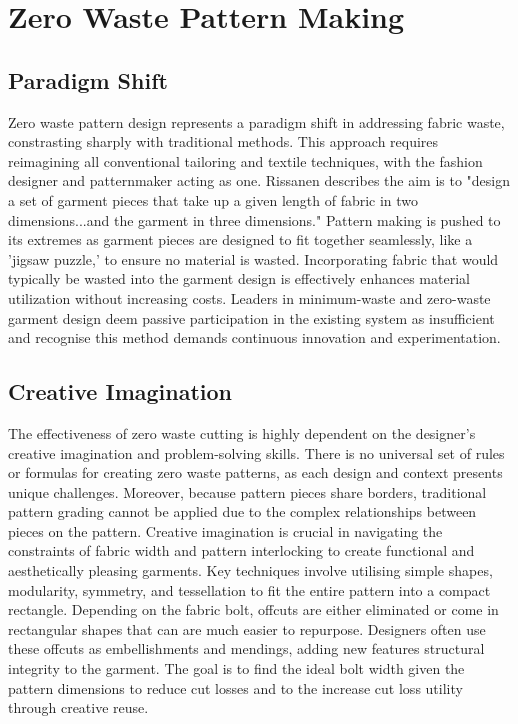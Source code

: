 \section{Zero Waste Pattern Making}
\subsection{Paradigm Shift}
Zero waste pattern design represents a paradigm shift in addressing fabric waste, constrasting sharply with traditional methods. This approach requires reimagining all conventional tailoring and textile techniques, with the fashion designer and patternmaker acting as one. Rissanen describes the aim is to "design a set of garment pieces that take up a given length of fabric in two dimensions...and the garment in three dimensions." Pattern making is pushed to its extremes as garment pieces are designed to fit together seamlessly, like a 'jigsaw puzzle,' to ensure no material is wasted. Incorporating fabric that would typically be wasted into the garment design is effectively enhances material utilization without increasing costs. Leaders in minimum-waste and zero-waste garment design deem passive participation in the existing system as insufficient and recognise this method demands continuous innovation and experimentation.

\subsection{Creative Imagination}
The effectiveness of zero waste cutting is highly dependent on the designer's creative imagination and problem-solving skills. There is no universal set of rules or formulas for creating zero waste patterns, as each design and context presents unique challenges. Moreover, because pattern pieces share borders, traditional pattern grading cannot be applied due to the complex relationships between pieces on the pattern. Creative imagination is crucial in navigating the constraints of fabric width and pattern interlocking to create functional and aesthetically pleasing garments. Key techniques involve utilising simple shapes, modularity, symmetry, and tessellation to fit the entire pattern into a compact rectangle. Depending on the fabric bolt, offcuts are either eliminated or come in rectangular shapes that can are much easier to repurpose. Designers often use these offcuts as embellishments and mendings, adding new features structural integrity to the garment. The goal is to find the ideal bolt width given the pattern dimensions to reduce cut losses and to the increase cut loss utility through creative reuse.

